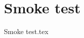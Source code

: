 \documentclass[a4paper,11pt]{book}
\begin{document}
\chapter{Smoke test}
{Smoke test.tex}
\end{document}
